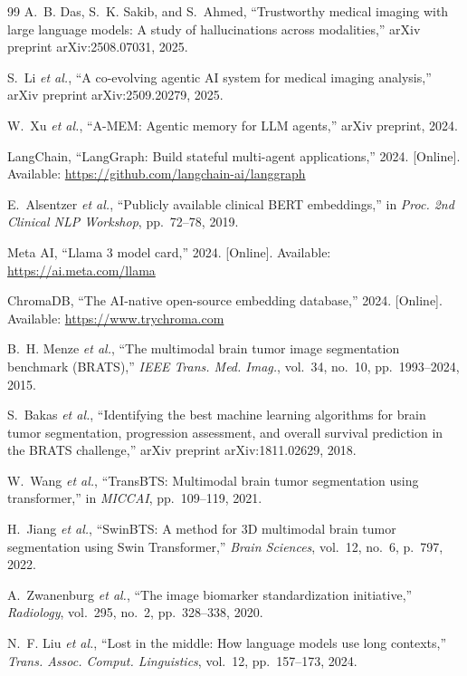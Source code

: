 \documentclass[journal]{IEEEtran}
\begin{document}
\begin{thebibliography}{99}
A.~B. Das, S.~K. Sakib, and S.~Ahmed, ``Trustworthy medical imaging with
large language models: A study of hallucinations across modalities,''
arXiv preprint arXiv:2508.07031, 2025.

S.~Li \textit{et al.}, ``A co-evolving agentic AI system for medical
imaging analysis,'' arXiv preprint arXiv:2509.20279, 2025.

W.~Xu \textit{et al.}, ``A-MEM: Agentic memory for LLM agents,''
arXiv preprint, 2024.

LangChain, ``LangGraph: Build stateful multi-agent applications,'' 2024.
[Online]. Available: \url{https://github.com/langchain-ai/langgraph}

E.~Alsentzer \textit{et al.}, ``Publicly available clinical BERT
embeddings,'' in \textit{Proc. 2nd Clinical NLP Workshop}, pp.~72--78,
2019.

Meta AI, ``Llama 3 model card,'' 2024.
[Online]. Available: \url{https://ai.meta.com/llama}

ChromaDB, ``The AI-native open-source embedding database,'' 2024.
[Online]. Available: \url{https://www.trychroma.com}

B.~H. Menze \textit{et al.}, ``The multimodal brain tumor image
segmentation benchmark (BRATS),'' \textit{IEEE Trans. Med. Imag.},
vol.~34, no.~10, pp.~1993--2024, 2015.

S.~Bakas \textit{et al.}, ``Identifying the best machine learning
algorithms for brain tumor segmentation, progression assessment, and
overall survival prediction in the BRATS challenge,''
arXiv preprint arXiv:1811.02629, 2018.

W.~Wang \textit{et al.}, ``TransBTS: Multimodal brain tumor segmentation
using transformer,'' in \textit{MICCAI}, pp.~109--119, 2021.

H.~Jiang \textit{et al.}, ``SwinBTS: A method for 3D multimodal brain
tumor segmentation using Swin Transformer,'' \textit{Brain Sciences},
vol.~12, no.~6, p.~797, 2022.

A.~Zwanenburg \textit{et al.}, ``The image biomarker standardization
initiative,'' \textit{Radiology}, vol.~295, no.~2, pp.~328--338, 2020.

N.~F. Liu \textit{et al.}, ``Lost in the middle: How language models use
long contexts,'' \textit{Trans. Assoc. Comput. Linguistics}, vol.~12,
pp.~157--173, 2024.


\end{thebibliography}
\end{document}
